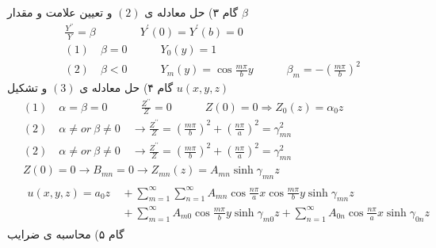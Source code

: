 گام ۳) حل معادله ی
$(2)$
و تعیین علامت و مقدار
$\beta$
\begin{equation*}
	\begin{aligned}
		{} &\
		\frac{Y^{\prime \prime}}{Y}=\beta  \quad\quad \quad\quad Y^{\prime}(0)=Y^{\prime}(b)=0
		\\ &\
		(1) \quad \beta=0  \quad\quad\quad Y_{0}(y)=1
		\\ &\
		(2) \quad \beta <0  \quad\quad\quad Y_{m}(y)=\cos\frac{m \pi}{b}y \quad\quad\quad \beta_{m}=-(\frac{m \pi}{b})^{2}
	\end{aligned}
\end{equation*}
گام ۴) حل معادله ی
$(3)$
و تشکیل
$u(x,y,z)$
\begin{equation*}
	\begin{aligned}
		{} &\
		(1) \quad \alpha= \beta=0  \quad\quad\quad \frac{Z^{\prime \prime}}{Z}=0 \quad\quad\quad Z(0)=0 \Rightarrow Z_{0}(z)=\alpha_{0}z
		\\ &\
		(2) \quad \alpha \neq  or \ \beta \neq 0  \quad\rightarrow \frac{Z^{\prime \prime}}{Z}=(\frac{m \pi}{b})^{2}+(\frac{n \pi}{a})^{2}=\gamma_{mn}^{2}
		\\ &\
		(2) \quad \alpha \neq  or \ \beta \neq 0  \quad\rightarrow \frac{Z^{\prime \prime}}{Z}=(\frac{m \pi}{b})^{2}+(\frac{n \pi}{a})^{2}=\gamma_{mn}^{2}
		\\ &\
		Z(0)=0 \rightarrow B_{mn}=0 \rightarrow Z_{mn}(z)=A_{mn} \sinh \gamma_{mn}z
		\\ &\
		\begin{aligned}
			u(x, y, z)=a_{0} z {} &\
			+\sum_{m=1}^{\infty} \sum_{n=1}^{\infty} A_{m n} \cos \frac{n \pi}{a} x \cos \frac{m \pi}{b} y \sinh \gamma_{m n} z 
			\\ &\
			+\sum_{m=1}^{\infty} A_{m 0} \cos \frac{m \pi}{b} y \sinh \gamma_{m 0} z+\sum_{n=1}^{\infty} A_{0 n} \cos \frac{n \pi}{a} x  \sinh \gamma_{0 n} z
		\end{aligned}
	\end{aligned}
\end{equation*}	
گام ۵) محاسبه ی ضرایب
